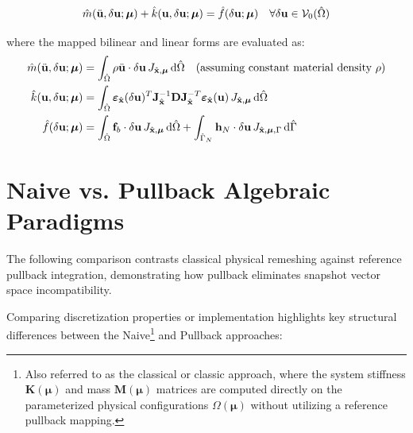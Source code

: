 \begin{equation}
    \hat{m}(\ddot{\mathbf{u}}, \delta\mathbf{u}; \boldsymbol{\mu}) + \hat{k}(\mathbf{u}, \delta\mathbf{u}; \boldsymbol{\mu}) = \hat{f}(\delta\mathbf{u}; \boldsymbol{\mu}) \quad \forall \delta\mathbf{u} \in \mathcal{V}_0(\hat{\Omega})
\end{equation}

where the mapped bilinear and linear forms are evaluated as:
\begin{align}
    \hat{m}(\ddot{\mathbf{u}}, \delta\mathbf{u}; \boldsymbol{\mu}) & = \int_{\hat{\Omega}} \rho \ddot{\mathbf{u}} \cdot \delta\mathbf{u} \, J_{\hat{\mathbf{x}}, \boldsymbol{\mu}} \, \mathrm{d}\hat{\Omega} \quad \text{(assuming constant material density $\rho$)}                                                                                                                                                 \\
    \hat{k}(\mathbf{u}, \delta\mathbf{u}; \boldsymbol{\mu})        & = \int_{\hat{\Omega}} \boldsymbol{\varepsilon}_{\hat{\mathbf{x}}}(\delta\mathbf{u})^T \mathbf{J}_{\hat{\mathbf{x}}}^{-1} \mathbf{D} \mathbf{J}_{\hat{\mathbf{x}}}^{-T} \boldsymbol{\varepsilon}_{\hat{\mathbf{x}}}(\mathbf{u}) \, J_{\hat{\mathbf{x}}, \boldsymbol{\mu}} \, \mathrm{d}\hat{\Omega} \\
    \hat{f}(\delta\mathbf{u}; \boldsymbol{\mu})                  & = \int_{\hat{\Omega}} \mathbf{f}_b \cdot \delta\mathbf{u} \, J_{\hat{\mathbf{x}}, \boldsymbol{\mu}} \, \mathrm{d}\hat{\Omega} + \int_{\hat{\Gamma}_N} \mathbf{h}_N \cdot \delta\mathbf{u} \, J_{\hat{\mathbf{x}}, \boldsymbol{\mu}, \Gamma} \, \mathrm{d}\hat{\Gamma}
\end{align}

\section{Naive vs. Pullback Algebraic Paradigms}

The following comparison contrasts classical physical remeshing against reference pullback integration, demonstrating how pullback eliminates snapshot vector space incompatibility.

Comparing discretization properties or implementation highlights key structural differences between the Naive\footnote{Also referred to as the classical or classic approach, where the system stiffness $\mathbf{K}(\boldsymbol{\mu})$ and mass $\mathbf{M}(\boldsymbol{\mu})$ matrices are computed directly on the parameterized physical configurations $\Omega(\boldsymbol{\mu})$ without utilizing a reference pullback mapping.} and Pullback approaches:

